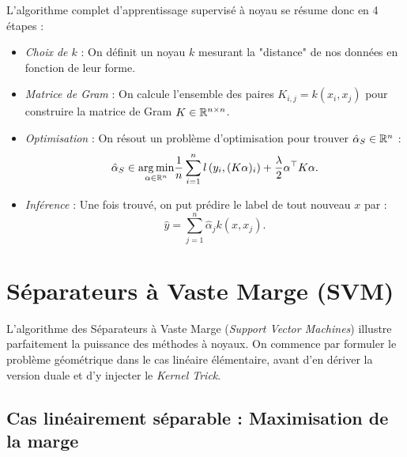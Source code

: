\begin{proposition}[La recette]
    L'algorithme complet d'apprentissage supervisé à noyau se résume donc en 4 étapes : 
    \begin{itemize}
        \item \emph{Choix de $k$} : On définit un noyau $k$ mesurant la "distance" de nos données en fonction de leur forme. 
        \item \emph{Matrice de Gram} : On calcule l'ensemble des paires $K _{i,j} = k(x_i, x_j)$ pour construire la matrice de Gram $K \in \mathbb{R}^{n \times n}$. 
        \item \emph{Optimisation} : On résout un problème d'optimisation pour trouver $ \hat{ \alpha}_S \in \mathbb{R}^n$ : 
        \begin{equation}
            \hat{ \alpha}_S \in \underset{ \alpha \in \mathbb{R}^n}{\arg \min} \frac{1}{n} \sum_{i=1}^{n} l \left(y_i , (K \alpha)_i\right) + \frac{ \lambda}{2} \alpha^\top K \alpha. 
        \end{equation}
        \item \emph{Inférence} : Une fois trouvé, on put prédire le label de tout nouveau $x$ par : 
        \begin{equation}
            \hat{y} = \sum_{j=1}^{n} \hat{ \alpha}_j k(x, x_j). 
        \end{equation}
    \end{itemize}
\end{proposition}


\section{Séparateurs à Vaste Marge (SVM)}

L'algorithme des Séparateurs à Vaste Marge (\emph{Support Vector Machines}) illustre parfaitement la puissance des méthodes à noyaux. On commence par formuler le problème géométrique dans le cas linéaire élémentaire, avant d'en dériver la version duale et d'y injecter le \emph{Kernel Trick}.

\subsection{Cas linéairement séparable : Maximisation de la marge}

